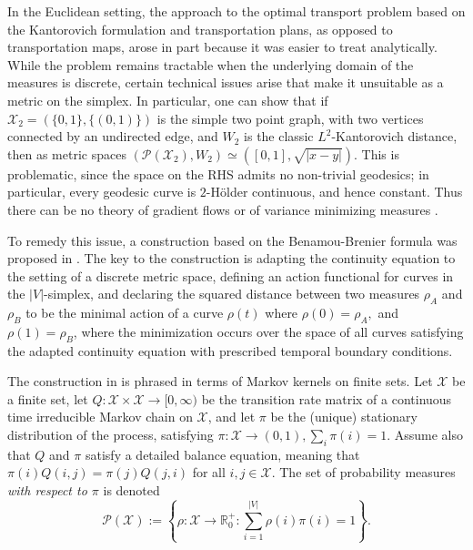 \documentclass{article}
\newcommand{\R}{\mathbb{R}}
\newcommand{\X}{\mathcal{X}}
\begin{document}
In the Euclidean setting, the approach to the optimal transport problem based on the Kantorovich formulation and transportation plans, as opposed to transportation maps, arose in part because it was easier to treat analytically. While the problem remains tractable when the underlying domain of the measures is discrete, certain technical issues arise that make it unsuitable as a metric on the simplex. In particular, one can show that if \(\X_2 = (\{0,1\}, \{(0,1)\})\) is the simple two point graph, with two vertices connected by an undirected edge, and \(W_2\) is the classic \newline \(L^2\)-Kantorovich distance, then as metric spaces \((\mathcal{P}(\X_2), W_2) \simeq ([0,1], \sqrt{|x-y|})\). This is problematic, since the space on the RHS admits no non-trivial geodesics; in particular, every geodesic curve is \(2\)-H{\"o}lder continuous, and hence constant. Thus there can be no theory of gradient flows or of variance minimizing measures \cite{maasGradientFlowsEntropy2011}.

To remedy this issue, a construction based on the Benamou-Brenier formula was proposed in \cite{maasGradientFlowsEntropy2011}. The key to the construction is adapting the continuity equation to the setting of a discrete metric space, defining an action functional for curves in the \(|V|\)-simplex, and declaring the squared distance between two measures \(\rho_A\) and \(\rho_B\) to be the minimal action of a curve \(\rho(t)\) where \(\rho(0) = \rho_A,\) and \(\rho(1) = \rho_B\), where the minimization occurs over the space of all curves satisfying the adapted continuity equation with prescribed temporal boundary conditions. 

The construction in \cite{maasGradientFlowsEntropy2011} is phrased in terms of Markov kernels on finite sets. Let \(\X\) be a finite set, let \(Q: \X \times \X \to [0, \infty)\) be the transition rate matrix of a continuous time irreducible Markov chain on \(\X\), and let \(\pi\) be the (unique) stationary distribution of the process, satisfying \(\pi: \X \to (0,1), \sum_i \pi(i) = 1\). Assume also that \(Q\) and \(\pi\) satisfy a detailed balance equation, meaning that \(\pi(i)Q(i,j) = \pi(j)Q(j,i)\) for all \(i,j \in \X\). The set of probability measures \emph{with respect to \(\pi\)} is denoted
\begin{equation*}
  \mathcal{P}(\X) := \left\{ \rho:\X\to\R_0^+ : \sum\limits_{i=1}^{|V|} \rho(i) \pi(i) = 1\right\}.
\end{equation*}
\end{document}
